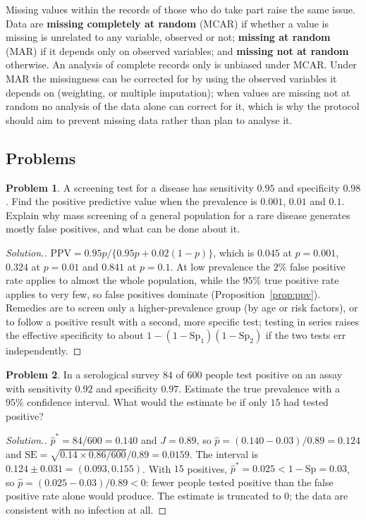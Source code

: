 \documentclass[11pt,a4paper]{article}
\numberwithin{equation}{section}
\theoremstyle{definition}
\newtheorem{problemx}{Problem}[subsection]
\newenvironment{problem}{\begin{problemx}}{\end{problemx}}
\newenvironment{solution}
  {\renewcommand{\qedsymbol}{}\begin{proof}[\textit{Solution}.]}
  {\end{proof}}
\begin{document}
Missing values within the records of those who do take part raise the same issue. Data are \textbf{missing completely at random} (MCAR)
if whether a value is missing is unrelated to any variable, observed or not; \textbf{missing at random} (MAR) if it depends only on observed
variables; and \textbf{missing not at random} otherwise. An analysis of complete records only is unbiased under MCAR. Under MAR the
missingness can be corrected for by using the observed variables it depends on (weighting, or multiple imputation); when values are
missing not at random no analysis of the data alone can correct for it, which is why the protocol should aim to prevent missing data
rather than plan to analyse it.

\subsection{Problems}

\begin{problem}
A screening test for a disease has sensitivity $0.95$ and specificity $0.98$. Find the positive predictive value when the prevalence
is $0.001$, $0.01$ and $0.1$. Explain why mass screening of a general population for a rare disease generates mostly false
positives, and what can be done about it.
\end{problem}

\begin{solution}
$\text{PPV} = 0.95p/\{0.95p + 0.02(1 - p)\}$, which is $0.045$ at $p = 0.001$, $0.324$ at $p = 0.01$ and $0.841$ at $p = 0.1$. At low prevalence the $2\%$
false positive rate applies to almost the whole population, while the $95\%$ true positive rate applies to very few, so false positives
dominate (Proposition~\ref{prop:ppv}). Remedies are to screen only a higher-prevalence group (by age or risk factors), or to follow a positive
result with a second, more specific test; testing in series raises the effective specificity to about $1 - (1 - \text{Sp}_1)(1 - \text{Sp}_2)$ if
the two tests err independently.
\end{solution}

\begin{problem}
In a serological survey $84$ of $600$ people test positive on an assay with sensitivity $0.92$ and specificity $0.97$. Estimate the true
prevalence with a $95\%$ confidence interval. What would the estimate be if only $15$ had tested positive?
\end{problem}

\begin{solution}
$\hat p^* = 84/600 = 0.140$ and $J = 0.89$, so $\hat p = (0.140 - 0.03)/0.89 = 0.124$ and $\text{SE} = \sqrt{0.14 \times 0.86/600}/0.89 = 0.0159$. The interval is
$0.124 \pm 0.031 = (0.093, 0.155)$. With $15$ positives, $\hat p^* = 0.025 < 1 - \text{Sp} = 0.03$, so $\hat p = (0.025 - 0.03)/0.89 < 0$: fewer people tested positive than
the false positive rate alone would produce. The estimate is truncated to $0$; the data are consistent with no infection at all.
\end{solution}
\end{document}
